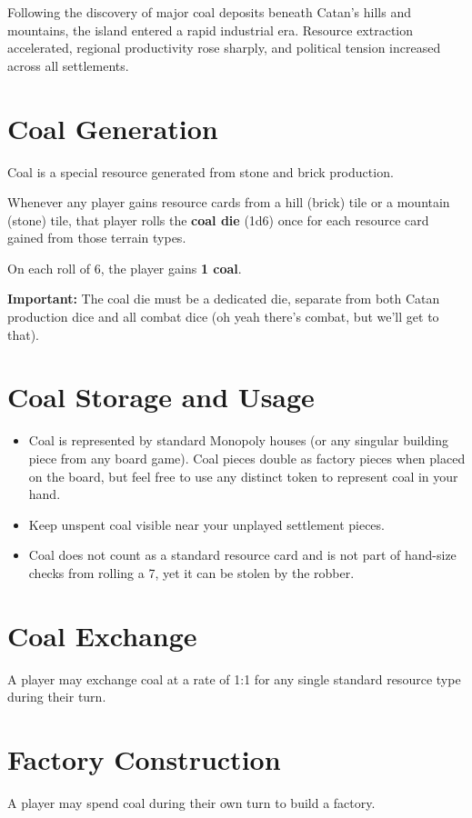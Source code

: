 \documentclass[12pt]{report}
\begin{document}
Following the discovery of major coal deposits beneath Catan's hills and mountains, the island entered a rapid industrial era. Resource extraction accelerated, regional productivity rose sharply, and political tension increased across all settlements.

\section{Coal Generation}
Coal is a special resource generated from stone and brick production.

Whenever any player gains resource cards from a hill (brick) tile or a mountain (stone) tile, that player rolls the \textbf{coal die} (1d6) once for each resource card gained from those terrain types.

On each roll of 6, the player gains \textbf{1 coal}.

\textbf{Important:} The coal die must be a dedicated die, separate from both Catan production dice and all combat dice (oh yeah there's combat, but we'll get to that).

\section{Coal Storage and Usage}
\begin{itemize}[leftmargin=1.2cm]
  \item Coal is represented by standard Monopoly houses (or any singular building piece from any board game). Coal pieces double as factory pieces when placed on the board, but feel free to use any distinct token to represent coal in your hand.
  \item Keep unspent coal visible near your unplayed settlement pieces.
  \item Coal does not count as a standard resource card and is not part of hand-size checks from rolling a 7, yet it can be stolen by the robber.
\end{itemize}

\section{Coal Exchange}
A player may exchange coal at a rate of 1:1 for any single standard resource type during their turn.

\section{Factory Construction}
A player may spend coal during their own turn to build a factory.
\end{document}
